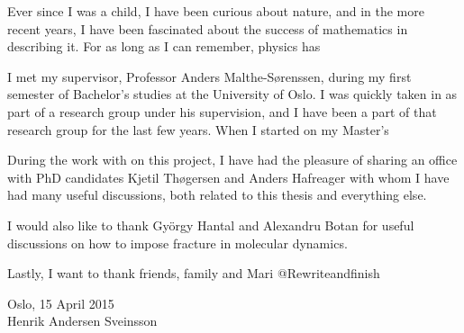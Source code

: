 \begin{acknowledgements}
Ever since I was a child, I have been curious about nature, and in the more recent years, I have been fascinated about the success of mathematics in describing it. For as long as I can remember, physics has 

I met my supervisor, Professor Anders Malthe-Sørenssen, during my first semester of Bachelor's studies at the University of Oslo. I was quickly taken in as part of a research group under his supervision, and I have been a part of that research group for the last few years. When I started on my Master's 

During the work with on this project, I have had the pleasure of sharing an office with PhD candidates Kjetil Thøgersen and Anders Hafreager with whom I have had many useful discussions, both related to this thesis and everything else. 

I would also like to thank Gy\"orgy Hantal and Alexandru Botan for useful discussions on how to impose  fracture in molecular dynamics.

Lastly, I want to thank friends, family and Mari
@Rewriteandfinish
\begin{flushright}
Oslo, 15 April 2015 \\
Henrik Andersen Sveinsson
\end{flushright}
\end{acknowledgements}
